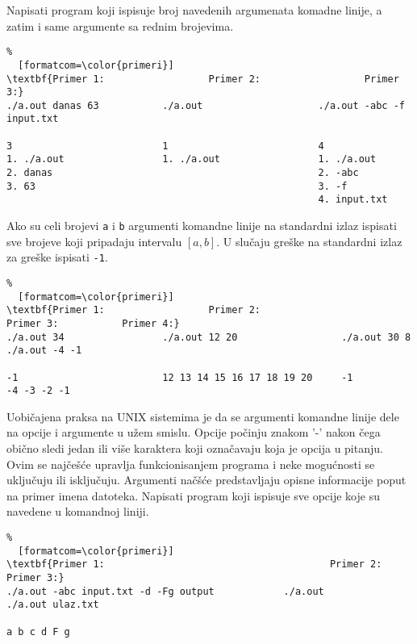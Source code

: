 \documentclass{article}
\begin{document}
\begin{z}
Napisati program koji ispisuje broj navedenih argumenata komadne linije, a zatim i same argumente sa rednim brojevima.
\end{z}
\begin{Verbatim}%
  [formatcom=\color{primeri}]
\textbf{Primer 1:                  Primer 2:                  Primer 3:}
./a.out danas 63           ./a.out                    ./a.out -abc -f input.txt

3                          1                          4
1. ./a.out                 1. ./a.out                 1. ./a.out
2. danas                                              2. -abc
3. 63                                                 3. -f
                                                      4. input.txt
\end{Verbatim}

\begin{z}
Ako su celi brojevi \verb|a| i \verb|b| argumenti komandne linije na standardni izlaz ispisati sve brojeve koji pripadaju intervalu $[a,b]$. 
U slučaju greške na standardni izlaz za greške ispisati {\tt -1}.  
\end{z}
\begin{Verbatim}%
  [formatcom=\color{primeri}]
\textbf{Primer 1:                  Primer 2:                      Primer 3:           Primer 4:}
./a.out 34                 ./a.out 12 20                  ./a.out 30 8        ./a.out -4 -1

-1                         12 13 14 15 16 17 18 19 20     -1                  -4 -3 -2 -1
\end{Verbatim}

\begin{z}
Uobi\v cajena praksa na UNIX sistemima je da se argumenti komandne
linije dele na opcije i argumente u u\v zem smislu. Opcije po\v cinju
znakom ’-’ nakon \v cega obi\v cno sledi jedan ili vi\v se karaktera
koji ozna\v cavaju koja je opcija u pitanju. Ovim se naj\v ce\v s\' ce
upravlja funkcionisanjem programa i neke mogu\' cnosti se uklju\v cuju
ili isklju\v cuju. Argumenti na\v c\v s\' ce predstavljaju opisne
informacije poput na primer imena datoteka. Napisati program koji
ispisuje sve opcije koje su navedene u komandnoj liniji.
\end{z}
\begin{Verbatim}%
  [formatcom=\color{primeri}]
\textbf{Primer 1:                                       Primer 2:              Primer 3:}
./a.out -abc input.txt -d -Fg output            ./a.out                ./a.out ulaz.txt  

a b c d F g
\end{Verbatim}
\end{document}
